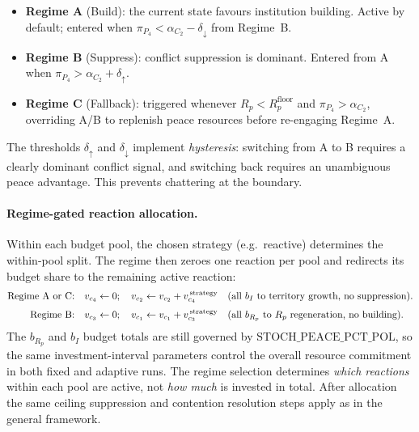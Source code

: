 \begin{itemize}[nosep]
    \item \textbf{Regime A} (Build): the current state favours institution
          building.  Active by default; entered when
          $\pi_{P_4} < \alpha_{C_2} - \delta_{\downarrow}$ from Regime~B.
    \item \textbf{Regime B} (Suppress): conflict suppression is dominant.
          Entered from A when $\pi_{P_4} > \alpha_{C_2} + \delta_{\uparrow}$.
    \item \textbf{Regime C} (Fallback): triggered whenever $R_p < R_p^{\text{floor}}$
          and $\pi_{P_4} > \alpha_{C_2}$, overriding A/B to replenish peace
          resources before re-engaging Regime~A.
\end{itemize}

The thresholds $\delta_{\uparrow}$ and $\delta_{\downarrow}$ implement
\emph{hysteresis}: switching from A to B requires a clearly dominant conflict
signal, and switching back requires an unambiguous peace advantage.  This
prevents chattering at the boundary.

\paragraph{Regime-gated reaction allocation.}
Within each budget pool, the chosen strategy (e.g.\ reactive) determines the
within-pool split.  The regime then zeroes one reaction per pool and redirects
its budget share to the remaining active reaction:
\begin{align}
    \text{Regime A or C:}&\quad v_{c_4} \leftarrow 0;\quad
        v_{c_2} \leftarrow v_{c_2} + v_{c_4}^{\,\text{strategy}}
        \quad\text{(all } b_I \text{ to territory growth, no suppression)}.
        \notag\\[3pt]
    \text{Regime B:}&\quad v_{c_3} \leftarrow 0;\quad
        v_{c_1} \leftarrow v_{c_1} + v_{c_3}^{\,\text{strategy}}
        \quad\text{(all } b_{R_p} \text{ to } R_p \text{ regeneration, no building)}.
        \notag
\end{align}
The $b_{R_p}$ and $b_I$ budget totals are still governed by
$\text{STOCH\_PEACE\_PCT\_POL}$, so the same investment-interval parameters
control the overall resource commitment in both fixed and adaptive runs.  The
regime selection determines \emph{which reactions} within each pool are active,
not \emph{how much} is invested in total.  After allocation the same ceiling
suppression and contention resolution steps apply as in the general framework.
